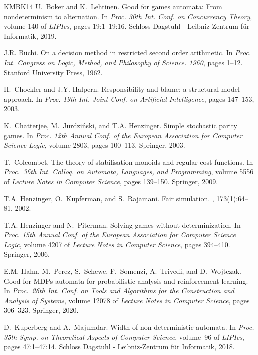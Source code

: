 \documentclass[10pt,a4paper]{amsart}
\theoremstyle{definition}
\numberwithin{equation}{section}
\begin{document}
\begin{thebibliography}{KMBK14}
U.~Boker and K.~Lehtinen.
\newblock Good for games automata: From nondeterminism to alternation.
\newblock In {\em Proc. 30th Int. Conf. on Concurrency Theory}, volume 140 of
  {\em LIPIcs}, pages 19:1--19:16. Schloss Dagstuhl - Leibniz-Zentrum f{\"{u}}r
  Informatik, 2019.

J.R. B{\"u}chi.
\newblock On a decision method in restricted second order arithmetic.
\newblock In {\em Proc. Int. Congress on Logic, Method, and Philosophy of
  Science. 1960}, pages 1--12. Stanford University Press, 1962.

H.~Chockler and J.Y. Halpern.
\newblock Responsibility and blame: a structural-model approach.
\newblock In {\em Proc. 19th Int. Joint Conf. on Artificial Intelligence},
  pages 147--153, 2003.

K.~Chatterjee, M.~Jurdzi{\'{n}}ski, and T.A. Henzinger.
\newblock Simple stochastic parity games.
\newblock In {\em Proc. 12th Annual Conf. of the European Association for
  Computer Science Logic}, volume 2803, pages 100--113. Springer, 2003.

T.~Colcombet.
\newblock The theory of stabilisation monoids and regular cost functions.
\newblock In {\em Proc.\ 36th Int. Colloq. on Automata, Languages, and
  Programming}, volume 5556 of {\em Lecture Notes in Computer Science}, pages
  139--150. Springer, 2009.

T.A. Henzinger, O.~Kupferman, and S.~Rajamani.
\newblock Fair simulation.
, 173(1):64--81, 2002.

T.A. Henzinger and N.~Piterman.
\newblock Solving games without determinization.
\newblock In {\em Proc. 15th Annual Conf. of the European Association for
  Computer Science Logic}, volume 4207 of {\em Lecture Notes in Computer
  Science}, pages 394--410. Springer, 2006.

E.M. Hahn, M.~Perez, S.~Schewe, F.~Somenzi, A.~Trivedi, and D.~Wojtczak.
\newblock Good-for-{MDPs} automata for probabilistic analysis and reinforcement
  learning.
\newblock In {\em Proc.\ 26th Int. Conf. on Tools and Algorithms for the
  Construction and Analysis of Systems}, volume 12078 of {\em Lecture Notes in
  Computer Science}, pages 306--323. Springer, 2020.

D.~Kuperberg and A.~Majumdar.
\newblock Width of non-deterministic automata.
\newblock In {\em Proc. 35th Symp. on Theoretical Aspects of Computer Science},
  volume~96 of {\em LIPIcs}, pages 47:1--47:14. Schloss Dagstuhl -
  Leibniz-Zentrum f{\"{u}}r Informatik, 2018.


\end{thebibliography}
\end{document}
